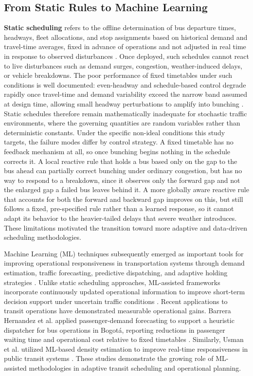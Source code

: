 \subsection{From Static Rules to Machine Learning}
\textbf{Static scheduling} refers to the offline determination of bus departure times, headways, fleet allocations, and stop assignments based on historical demand and travel-time averages, fixed in advance of operations and not adjusted in real time in response to observed disturbances \cite{Ceder2007}. Once deployed, such schedules cannot react to live disturbances such as demand surges, congestion, weather-induced delays, or vehicle breakdowns. The poor performance of fixed timetables under such conditions is well documented: even-headway and schedule-based control degrade rapidly once travel-time and demand variability exceed the narrow band assumed at design time, allowing small headway perturbations to amplify into bunching \cite{Daganzo2009}. Static schedules therefore remain mathematically inadequate for stochastic traffic environments, where the governing quantities are random variables rather than deterministic constants. Under the specific non-ideal conditions this study targets, the failure modes differ by control strategy. A fixed timetable has no feedback mechanism at all, so once bunching begins nothing in the schedule corrects it. A local reactive rule that holds a bus based only on the gap to the bus ahead can partially correct bunching under ordinary congestion, but has no way to respond to a breakdown, since it observes only the forward gap and not the enlarged gap a failed bus leaves behind it. A more globally aware reactive rule that accounts for both the forward and backward gap improves on this, but still follows a fixed, pre-specified rule rather than a learned response, so it cannot adapt its behavior to the heavier-tailed delays that severe weather introduces. These limitations motivated the transition toward more adaptive and data-driven scheduling methodologies.

Machine Learning (ML) techniques subsequently emerged as important tools for improving operational responsiveness in transportation systems through demand estimation, traffic forecasting, predictive dispatching, and adaptive holding strategies \cite{huang2019,patil2025}. Unlike static scheduling approaches, ML-assisted frameworks incorporate continuously updated operational information to improve short-term decision support under uncertain traffic conditions \cite{huang2019}. Recent applications to transit operations have demonstrated measurable operational gains. Barrera Hernandez et al. applied passenger-demand forecasting to support a heuristic dispatcher for bus operations in Bogotá, reporting reductions in passenger waiting time and operational cost relative to fixed timetables \cite{Barrera2025Optimization}. Similarly, Usman et al. utilized ML-based density estimation to improve real-time responsiveness in public transit systems \cite{Usman2025ML}. These studies demonstrate the growing role of ML-assisted methodologies in adaptive transit scheduling and operational planning.

